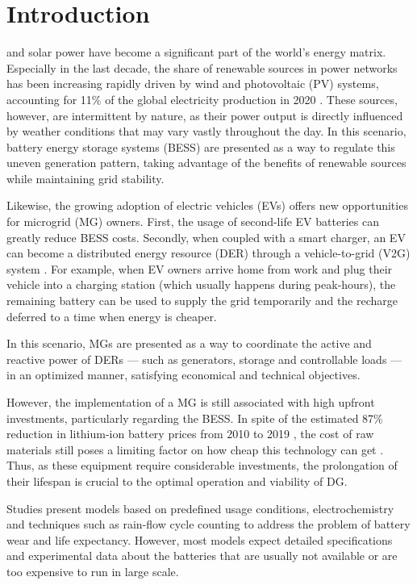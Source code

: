 \documentclass{ieeeaccess}
\begin{document}
\section{Introduction}
\label{sec:introduction}
     and solar power have become a significant part of the world's energy matrix. Especially in the last decade, the share of renewable sources in power networks has been increasing rapidly driven by wind and photovoltaic (PV) systems, accounting for 11\% of the global electricity production in 2020 \cite{KOCER2019}\cite{EMBER2021}. These sources, however, are intermittent by nature, as their power output is directly influenced by weather conditions that may vary vastly throughout the day. In this scenario, battery energy storage systems (BESS) are presented as a way to regulate this uneven generation pattern, taking advantage of the benefits of renewable sources while maintaining grid stability.

    Likewise, the growing adoption of electric vehicles (EVs) offers new opportunities for microgrid (MG) owners. First, the usage of second-life EV batteries can greatly reduce BESS costs. Secondly, when coupled with a smart charger, an EV can become a distributed energy resource (DER) through a vehicle-to-grid (V2G) system \cite{KEELI2012}. For example, when EV owners arrive home from work and plug their vehicle into a charging station (which usually happens during peak-hours), the remaining battery can be used to supply the grid temporarily and the recharge deferred to a time when energy is cheaper.

    In this scenario, MGs are presented as a way to coordinate the active and reactive power of DERs --- such as generators, storage and controllable loads --- in an optimized manner, satisfying economical and technical objectives.

    However, the implementation of a MG is still associated with high upfront investments, particularly regarding the BESS. In spite of the estimated 87\% reduction in lithium-ion battery prices from 2010 to 2019 \cite{BBERG2019}, the cost of raw materials still poses a limiting factor on how cheap this technology can get \cite{HSIEH2019}. Thus, as these equipment require considerable investments, the prolongation of their lifespan is crucial to the optimal operation and viability of DG.

    Studies \cite{ECKER2014,NARAYAN2018,DIMEASHATZIARGYRIOU2005,MARYAMA2013} present models based on predefined usage conditions, electrochemistry and techniques such as rain-flow cycle counting to address the problem of battery wear and life expectancy. However, most models expect detailed specifications and experimental data about the batteries that are usually not available or are too expensive to run in large scale.
\end{document}
